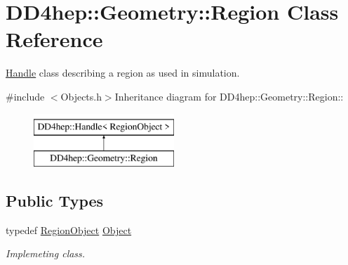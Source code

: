 \hypertarget{class_d_d4hep_1_1_geometry_1_1_region}{
\section{DD4hep::Geometry::Region Class Reference}
\label{class_d_d4hep_1_1_geometry_1_1_region}
}


\hyperlink{class_d_d4hep_1_1_handle}{Handle} class describing a region as used in simulation.  


{\ttfamily \#include $<$Objects.h$>$}Inheritance diagram for DD4hep::Geometry::Region::\begin{figure}[H]
\begin{center}
\leavevmode
\includegraphics[height=2cm]{class_d_d4hep_1_1_geometry_1_1_region}
\end{center}
\end{figure}
\subsection*{Public Types}
\begin{DoxyCompactItemize}
\item 
typedef \hyperlink{class_d_d4hep_1_1_geometry_1_1_region_object}{RegionObject} \hyperlink{class_d_d4hep_1_1_geometry_1_1_region_ab66f17984d7dad2a865c8950b3604503}{Object}
\begin{DoxyCompactList}\small\item\em Implemeting class. \item\end{DoxyCompactList}\end{DoxyCompactItemize}
